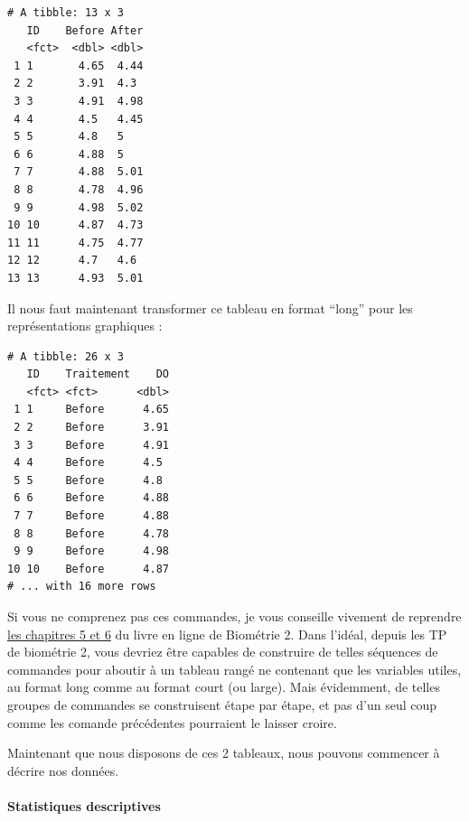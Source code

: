 \documentclass[a4paperpaper,]{article}
\newenvironment{Shaded}{\begin{snugshade}}{\end{snugshade}}
\newcommand{\DataTypeTok}[1]{\textcolor[rgb]{0.00,0.34,0.68}{#1}}
\newcommand{\KeywordTok}[1]{\textcolor[rgb]{0.12,0.11,0.11}{\textbf{#1}}}
\newcommand{\NormalTok}[1]{\textcolor[rgb]{0.12,0.11,0.11}{#1}}
\newcommand{\OperatorTok}[1]{\textcolor[rgb]{0.12,0.11,0.11}{#1}}
\newcommand{\OtherTok}[1]{\textcolor[rgb]{0.00,0.43,0.16}{#1}}
\newcommand{\StringTok}[1]{\textcolor[rgb]{0.75,0.01,0.01}{#1}}
\let\oldparagraph\paragraph
\renewcommand{\paragraph}[1]{\oldparagraph{#1}\mbox{}}
\begin{document}
\begin{verbatim}
# A tibble: 13 x 3
   ID    Before After
   <fct>  <dbl> <dbl>
 1 1       4.65  4.44
 2 2       3.91  4.3 
 3 3       4.91  4.98
 4 4       4.5   4.45
 5 5       4.8   5   
 6 6       4.88  5   
 7 7       4.88  5.01
 8 8       4.78  4.96
 9 9       4.98  5.02
10 10      4.87  4.73
11 11      4.75  4.77
12 12      4.7   4.6 
13 13      4.93  5.01
\end{verbatim}

Il nous faut maintenant transformer ce tableau en format ``long'' pour les représentations graphiques :

\begin{Shaded}
\end{Shaded}

\begin{verbatim}
# A tibble: 26 x 3
   ID    Traitement    DO
   <fct> <fct>      <dbl>
 1 1     Before      4.65
 2 2     Before      3.91
 3 3     Before      4.91
 4 4     Before      4.5 
 5 5     Before      4.8 
 6 6     Before      4.88
 7 7     Before      4.88
 8 8     Before      4.78
 9 9     Before      4.98
10 10    Before      4.87
# ... with 16 more rows
\end{verbatim}

Si vous ne comprenez pas ces commandes, je vous conseille vivement de reprendre \href{https://besibo.github.io/DA/tidyr.html}{les chapitres 5 et 6} du livre en ligne de Biométrie 2. Dans l'idéal, depuis les TP de biométrie 2, vous devriez être capables de construire de telles séquences de commandes pour aboutir à un tableau rangé ne contenant que les variables utiles, au format long comme au format court (ou large). Mais évidemment, de telles groupes de commandes se construisent étape par étape, et pas d'un seul coup comme les comande précédentes pourraient le laisser croire.

Maintenant que nous disposons de ces 2 tableaux, nous pouvons commencer à décrire nos données.

\hypertarget{statistiques-descriptives-1}{%
\paragraph{Statistiques descriptives}\label{statistiques-descriptives-1}}
\end{document}

